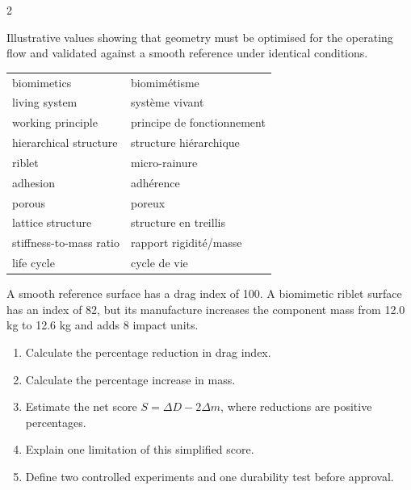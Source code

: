\begin{multicols}{2}
\begin{tcolorbox}[title=\sffamily\bfseries Illustrative drag comparison,colback=white,colframe=ECPurple]
\begin{center}
\end{center}
\footnotesize Illustrative values showing that geometry must be optimised for the operating flow and
validated against a smooth reference under identical conditions.
\end{tcolorbox}

\begin{vocabulary}
\begin{tabularx}{\linewidth}{@{}lX@{}}
biomimetics & biomimétisme\\
living system & système vivant\\
working principle & principe de fonctionnement\\
hierarchical structure & structure hiérarchique\\
riblet & micro-rainure\\
adhesion & adhérence\\
porous & poreux\\
lattice structure & structure en treillis\\
stiffness-to-mass ratio & rapport rigidité/masse\\
life cycle & cycle de vie
\end{tabularx}
\end{vocabulary}

\begin{applicationexercise}
A smooth reference surface has a drag index of 100. A biomimetic riblet surface has an index of 82,
but its manufacture increases the component mass from 12.0 kg to 12.6 kg and adds 8 impact units.
\begin{enumerate}
\item Calculate the percentage reduction in drag index.
\item Calculate the percentage increase in mass.
\item Estimate the net score $S=\Delta D-2\Delta m$, where reductions are positive percentages.
\item Explain one limitation of this simplified score.
\item Define two controlled experiments and one durability test before approval.
\end{enumerate}
\end{applicationexercise}


\end{multicols}
